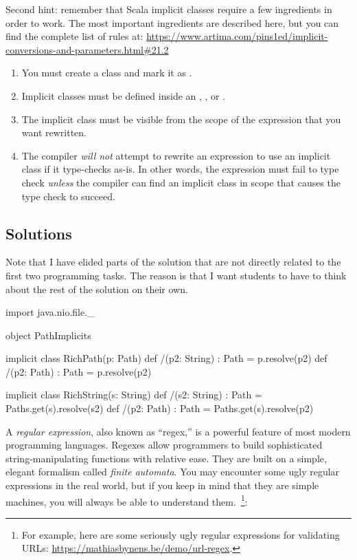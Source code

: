 \documentclass[9pt]{extbook}
\begin{document}
Second hint: remember that Scala implicit classes require a few ingredients in order to work.  The most important ingredients are described here, but you can find the complete list of rules at: \url{https://www.artima.com/pins1ed/implicit-conversions-and-parameters.html#21.2}

\begin{enumerate}
  \item You must create a class and mark it as .
  \item Implicit classes must be defined inside an , , or .
  \item The implicit class must be visible from the scope of the expression that you want rewritten.
  \item The compiler \emph{will not} attempt to rewrite an expression to use an implicit class if it type-checks as-is.  In other words, the expression must fail to type check \emph{unless} the compiler can find an implicit class in scope that causes the type check to succeed.
\end{enumerate}

\begin{instructor}
\section{Solutions}
  
Note that I have elided parts of the solution that are not directly related to the first two programming tasks.  The reason is that I want students to have to think about the rest of the solution on their own.

\begin{scalacode}
  import java.nio.file._

  object PathImplicits {  
    implicit class RichPath(p: Path) {
      def /(p2: String) : Path = p.resolve(p2)
      def /(p2: Path) : Path = p.resolve(p2)
    }

    implicit class RichString(s: String) {
      def /(s2: String) : Path = Paths.get(s).resolve(s2)
      def /(p2: Path) : Path = Paths.get(s).resolve(p2)
    }
  }
\end{scalacode}
  
\end{instructor}



A \emph{regular expression}, also known as ``regex,'' is a powerful feature of most modern programming languages.  Regexes allow programmers to build sophisticated string-manipulating functions with relative ease.  They are built on a simple, elegant formalism called \emph{finite automata}.  You may encounter some ugly regular expressions in the real world, but if you keep in mind that they are simple machines, you will always be able to understand them.~\footnote{For example, here are some seriously ugly regular expressions for validating URLs: \url{https://mathiasbynens.be/demo/url-regex}.}:
\end{document}
